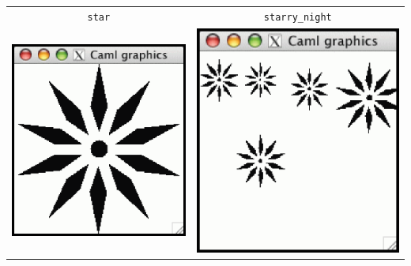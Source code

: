 \begin{center}
\begin{tabular}{cc}
\hbox{\lstinline/star/} & \hbox{\lstinline/starry_night/}\\
\includegraphics[scale=0.3]{graphics3}
&
\includegraphics[scale=0.3]{graphics4}
\end{tabular}
\end{center}

